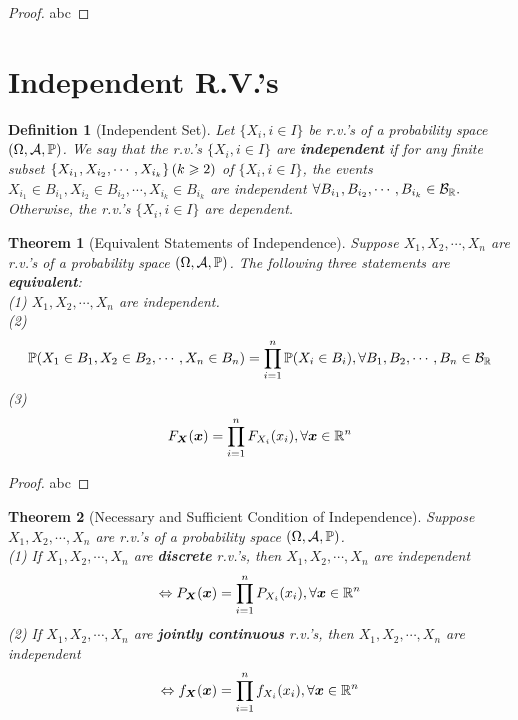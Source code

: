 \documentclass[openany,12pt]{book}
\newtheorem{theorem}{Theorem}[chapter]
\newtheorem{definition}{Definition}[chapter]
\begin{document}
\begin{proof}
  abc
\end{proof}

\section{Independent R.V.'s}

\begin{definition}[Independent Set]
  Let $\{X_{i}, i \in I\}$ be r.v.'s of a probability space $(\Omega,\mathcal{A},\mathbb{P})$. We say that the r.v.'s $\{X_{i}, i \in I\}$ are \textbf{independent} if for any finite subset
  $\left\{ X_{i_{1}},X_{i_{2}}, \cdots,X_{i_{k}} \right\} (k \geqslant 2)$ of $\{ X_{i}, i \in I\}$, the events $X_{i_{1}} \in B_{i_{1}},X_{i_{2}} \in B_{i_{2}}, \cdots,X_{i_{k}} \in B_{i_{k}}$ are independent $\forall B_{i_{1}},B_{i_{2}}, \cdots,B_{i_{k}} \in \mathcal{B}_{\mathbb{R}}.$ Otherwise, the r.v.'s $\{X_{i}, i \in I\}$ are dependent.
\end{definition}

\begin{theorem}[Equivalent Statements of Independence]
  Suppose $X_{1}, X_{2}, \cdots,X_{n}$ are r.v.'s of a probability space $(\Omega,\mathcal{A},\mathbb{P})$. The following three statements are \textbf{equivalent}:\\
  (1) $X_{1}, X_{2}, \cdots,X_{n}$ are independent.\\
  (2)
  \[\mathbb{P}( X_{1} \in B_{1},X_{2} \in B_{2}, \cdots,X_{n} \in B_{n})= \prod_{i = 1}^{n}{\mathbb{P}(X_{i} \in B_{i})},\forall B_{1},B_{2}, \cdots,B_{n} \in \mathcal{B}_{\mathbb{R}}\]
  (3)
  \[F_{\bm{X}}(\bm{x})= \prod_{i = 1}^{n}{F_{X_{i}}(x_{i})}, \forall \bm{x}\in \mathbb{R}^{n}\]
\end{theorem}

\begin{proof}
  abc
\end{proof}

\begin{theorem}[Necessary and Sufficient Condition of Independence]
  Suppose $X_{1}, X_{2}, \cdots,X_{n}$ are r.v.'s of a probability
  space $(\Omega,\mathcal{A},\mathbb{P})$.\\
  (1) If $X_{1}, X_{2}, \cdots,X_{n}$ are \textbf{discrete} r.v.'s, then $X_{1}, X_{2}, \cdots,X_{n}$ are independent
  \[\Leftrightarrow P_{\bm{X}}(\bm{x})= \prod_{i = 1}^{n}{P_{X_{i}}(x_{i})}, \forall\bm{x} \in \mathbb{R}^{n}\]
  (2) If $X_{1}, X_{2}, \cdots,X_{n}$ are \textbf{jointly continuous}
  r.v.'s, then $X_{1}, X_{2}, \cdots,X_{n}$ are independent
  \[\Leftrightarrow f_{\bm{X}}(\bm{x})= \prod_{i = 1}^{n}{f_{X_{i}}(x_{i})}, \forall \bm{x}\in \mathbb{R}^{n}\]
\end{theorem}
\end{document}
